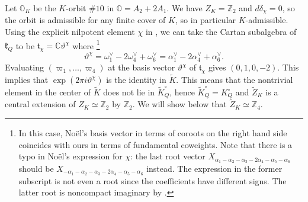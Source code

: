 \documentclass[12pt]{amsart}
\newcommand{\C}{\mathbb{C}}
\newcommand{\Orb}{\mathbb{O}}
\newcommand{\Z}{\mathbb{Z}}
\newcommand{\kf}{\mathfrak{k}}
\newcommand{\tf}{\mathfrak{t}}
\theoremstyle{definition}
\numberwithin{equation}{section}
\begin{document}
Let $\Orb_K$ be the $K$-orbit $\# 10$ in $\Orb=A_2+2A_1$. We have $Z_K = \Z_2$ and $d \delta_\chi = 0$, so the orbit is admissible for any finite cover of $K$, so in particular $K$-admissible. Using the explicit nilpotent element $\chi$ in \cite[Table 4]{Noel2}, we can take the Cartan subalgebra of $\kf_Q$ to be $\tf_\chi =  \C \vartheta^{\chi}$ where \footnote{In this case, No{\"e}l's basis vector in terms of coroots on the right hand side coincides with ours in terms of fundamental coweights. Note that there is a typo in No{\"e}l's expression for $\chi$: the last root vector $X_{\alpha_1 - \alpha_2 - \alpha_3 - 2 \alpha_4 - \alpha_5 - \alpha_6}$ should be $X_{-\alpha_1 - \alpha_2 - \alpha_3 - 2 \alpha_4 - \alpha_5 - \alpha_6}$ instead. The expression in the former subscript is not even a root since the coefficients have different signs. The latter root is  noncompact imaginary by \cite[Table 3]{Noel2}.}
\[ \vartheta^{\chi} = \omega^\vee_1 -2 \omega^\vee_4 + \omega^\vee_6 = \alpha^\vee_1 -2 \alpha^\vee_4 + \alpha^\vee_6.\]
Evaluating $(\varpi_1, \ldots, \varpi_4)$ at the basis vector $\vartheta^{\chi}$ of $\tf_\chi$ gives $(0, 1, 0, -2)$. This implies that $\exp(2\pi i \vartheta^{\chi})$ is the identity in $\tilde{K}$. This means that the nontrivial element in the center of $\tilde{K}$ does not lie in $\tilde{K}_Q^\circ$, hence  $\tilde{K}_Q^\circ=K_Q^\circ$ and $\tilde{Z}_K$ is a central extension of $Z_K \simeq \Z_2$ by $\Z_2$. We will show below that $\tilde{Z}_K \simeq \Z_4$.
\end{document}
